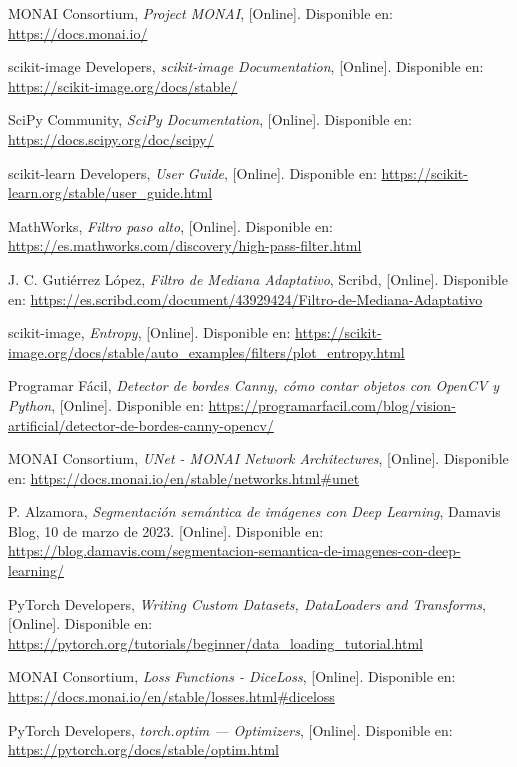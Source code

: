 \documentclass[12pt]{article}
\begin{document}
\begin{thebibliography}{9}
MONAI Consortium, \textit{Project MONAI}, [Online]. Disponible en: \url{https://docs.monai.io/}

scikit-image Developers, \textit{scikit-image Documentation}, [Online]. Disponible en: \url{https://scikit-image.org/docs/stable/}

SciPy Community, \textit{SciPy Documentation}, [Online]. Disponible en: \url{https://docs.scipy.org/doc/scipy/}

scikit-learn Developers, \textit{User Guide}, [Online]. Disponible en: \url{https://scikit-learn.org/stable/user_guide.html}

MathWorks, \textit{Filtro paso alto}, [Online]. Disponible en: \url{https://es.mathworks.com/discovery/high-pass-filter.html}

J. C. Gutiérrez López, \textit{Filtro de Mediana Adaptativo}, Scribd, [Online]. Disponible en: \url{https://es.scribd.com/document/43929424/Filtro-de-Mediana-Adaptativo}

scikit-image, \textit{Entropy}, [Online]. Disponible en: \url{https://scikit-image.org/docs/stable/auto_examples/filters/plot_entropy.html}

Programar Fácil, \textit{Detector de bordes Canny, cómo contar objetos con OpenCV y Python}, [Online]. Disponible en: \url{https://programarfacil.com/blog/vision-artificial/detector-de-bordes-canny-opencv/}

MONAI Consortium, \textit{UNet - MONAI Network Architectures}, [Online]. Disponible en: \url{https://docs.monai.io/en/stable/networks.html#unet}

P. Alzamora, \textit{Segmentación semántica de imágenes con Deep Learning}, Damavis Blog, 10 de marzo de 2023. [Online]. Disponible en: \url{https://blog.damavis.com/segmentacion-semantica-de-imagenes-con-deep-learning/}

PyTorch Developers, \textit{Writing Custom Datasets, DataLoaders and Transforms}, [Online]. Disponible en: \url{https://pytorch.org/tutorials/beginner/data_loading_tutorial.html}

MONAI Consortium, \textit{Loss Functions - DiceLoss}, [Online]. Disponible en: \url{https://docs.monai.io/en/stable/losses.html#diceloss}

PyTorch Developers, \textit{torch.optim — Optimizers}, [Online]. Disponible en: \url{https://pytorch.org/docs/stable/optim.html}


\end{thebibliography}
\end{document}
